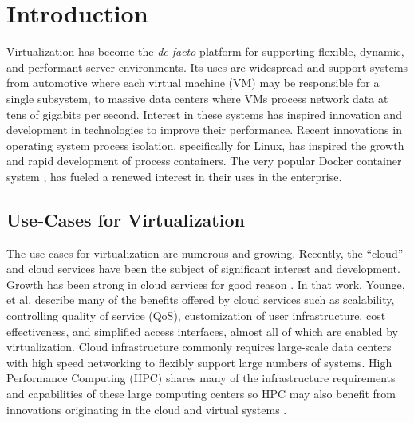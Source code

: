 \chapter{Introduction}
\label{sec:introduction}
Virtualization has become the \emph{de facto} platform for supporting flexible, dynamic, and performant server environments.  
Its uses are widespread and support systems from automotive where each virtual machine (VM) may be responsible for a single subsystem, to massive data centers where VMs process network data at tens of gigabits per second.
Interest in these systems has inspired innovation and development in technologies to improve their performance.
Recent innovations in operating system process isolation, specifically for Linux, has inspired the growth and rapid development of process containers.
The very popular Docker container system \autocite{dockerdotcom}, has fueled a renewed interest in their uses in the enterprise.

\section{Use-Cases for Virtualization} %
\label{sec:introusecasesvt}
The use cases for virtualization are numerous and growing. 
Recently, the ``cloud'' and cloud services have been the subject of significant interest and development.
Growth has been strong in cloud services for good reason \autocite{_younge_1}.
In that work, Younge, et al. describe many of the benefits offered by cloud services such as scalability, controlling quality of service (QoS), customization of user infrastructure, cost effectiveness, and simplified access interfaces, almost all of which are enabled by virtualization.  
Cloud infrastructure commonly requires large-scale data centers with high speed networking to flexibly support large numbers of systems.  
High Performance Computing (HPC) shares many of the infrastructure requirements and capabilities of these large computing centers so HPC may also benefit from innovations originating in the cloud and virtual systems \autocite{xavier2013performance, _younge_1}.

